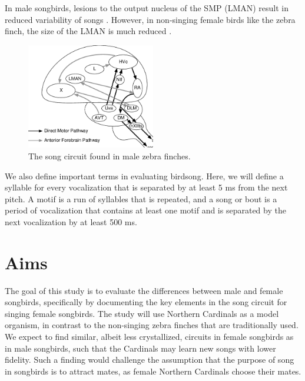 \documentclass[12pt]{article}
\begin{document}
In male songbirds, lesions to the output nucleus of the SMP (LMAN) result in reduced variability of songs \cite{Mooney1}. However, in non-singing female birds like the zebra finch, the size of the LMAN is much reduced \cite{Nixdorf}. 

\begin{figure}[ht]
\centering
\includegraphics[width=0.5\textwidth]{song_circuit.png}
\caption{\label{fig:song_circuit}The song circuit found in male zebra finches.}
\end{figure}

We also define important terms in evaluating birdsong. Here, we will define a syllable for every vocalization that is separated by at least 5 ms from the next pitch. A motif is a run of syllables that is repeated, and a song or bout is a period of vocalization that contains at least one motif and is separated by the next vocalization by at least 500 ms.


\section{Aims}
    The goal of this study is to evaluate the differences between male and female songbirds, specifically by documenting the key elements in the song circuit for singing female songbirds. The study will use Northern Cardinals as a model organism, in contrast to the non-singing zebra finches that are traditionally used. We expect to find similar, albeit less crystallized, circuits in female songbirds as in male songbirds, such that the Cardinals may learn new songs with lower fidelity. Such a finding would challenge the assumption that the purpose of song in songbirds is to attract mates, as female Northern Cardinals choose their mates.


\end{document}
